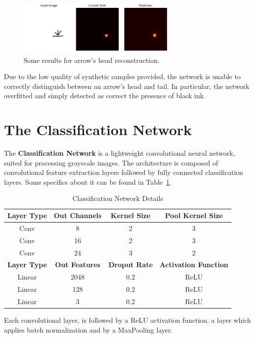 \documentclass[conference]{IEEEtran}
\begin{document}
\begin{appendices}
\begin{figure}[H]
	\centering
	\includegraphics[width=225pt, height=75pt]{arrownet1.jpg}
	\caption{Some results for arrow's head reconstruction.}
	\label{fig:arrownet1}
\end{figure}

Due to the low quality of synthetic samples provided, the network is unable to correctly distinguish between an arrow's head and tail. In particular, the network overfitted and simply detected as correct the presence of black ink.

\section{The Classification Network}
\label{classification_net}

The \textbf{Classification Network} is a lightweight convolutional neural network, suited for processing grayscale images. The architecture is composed of convolutional feature extraction layers followed by fully connected classification layers. Some specifics about it can be found in Table~\ref{tab:classification-architecture}.

\begin{table}[h]
	\centering
	\caption{Classification Network Details}
	\label{tab:classification-architecture}
	\begin{tabular}{|c|c|c|c|}
		\hline
		\textbf{Layer Type} & \textbf{Out Channels} & \textbf{Kernel Size} & \textbf{Pool Kernel Size} \\
		\hline 
		Conv & 8 & 2 & 3 \\
		Conv & 16 & 2  & 3 \\
		Conv & 24 & 3  & 2 \\
		\hline
		\textbf{Layer Type} & \textbf{Out Features} & \textbf{Droput Rate} & \textbf{Activation Function} \\
		\hline 
		Linear & 2048 & 0.2 & ReLU \\
		Linear & 128 & 0.2 & ReLU \\
		Linear & 3 & 0.2 & ReLU \\
		\hline
	\end{tabular}
\end{table}

Each convolutional layer, is followed by a ReLU activation function, a layer which applies batch normalization and by a MaxPooling layer.

\end{appendices}
\end{document}
